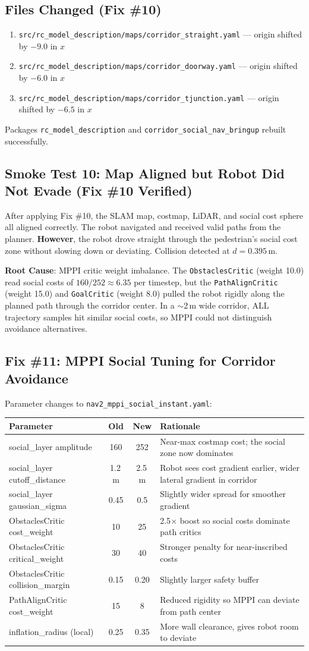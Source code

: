 \documentclass[11pt]{article}
\newcommand{\logentry}[1]{\subsection*{#1}}
\begin{document}
\logentry{Files Changed (Fix \#10)}
\begin{enumerate}
  \item \texttt{src/rc\_model\_description/maps/corridor\_straight.yaml} --- origin shifted by $-9.0$ in $x$
  \item \texttt{src/rc\_model\_description/maps/corridor\_doorway.yaml} --- origin shifted by $-6.0$ in $x$
  \item \texttt{src/rc\_model\_description/maps/corridor\_tjunction.yaml} --- origin shifted by $-6.5$ in $x$
\end{enumerate}
Packages \texttt{rc\_model\_description} and
\texttt{corridor\_social\_nav\_bringup} rebuilt successfully.

\logentry{Smoke Test 10: Map Aligned but Robot Did Not Evade (Fix \#10 Verified)}
After applying Fix \#10, the SLAM map, costmap, LiDAR, and social cost sphere all
aligned correctly. The robot navigated and received valid paths from the planner.
\textbf{However}, the robot drove straight through the pedestrian's social cost zone
without slowing down or deviating. Collision detected at $d = 0.395$\,m.

\textbf{Root Cause}: MPPI critic weight imbalance. The \texttt{ObstaclesCritic}
(weight 10.0) read social costs of $160/252 \approx 6.35$ per timestep, but the
\texttt{PathAlignCritic} (weight 15.0) and \texttt{GoalCritic} (weight 8.0) pulled
the robot rigidly along the planned path through the corridor center. In a $\sim$2\,m
wide corridor, ALL trajectory samples hit similar social costs, so MPPI could not
distinguish avoidance alternatives.

\logentry{Fix \#11: MPPI Social Tuning for Corridor Avoidance}
Parameter changes to \texttt{nav2\_mppi\_social\_instant.yaml}:
\begin{center}
\begin{tabular}{|l|c|c|p{5cm}|}
\hline
\textbf{Parameter} & \textbf{Old} & \textbf{New} & \textbf{Rationale} \\
\hline
social\_layer amplitude & 160 & 252 & Near-max costmap cost; the social zone now
dominates \\
\hline
social\_layer cutoff\_distance & 1.2\,m & 2.5\,m & Robot sees cost gradient earlier,
wider lateral gradient in corridor \\
\hline
social\_layer gaussian\_sigma & 0.45 & 0.5 & Slightly wider spread for smoother
gradient \\
\hline
ObstaclesCritic cost\_weight & 10 & 25 & 2.5$\times$ boost so social costs dominate
path critics \\
\hline
ObstaclesCritic critical\_weight & 30 & 40 & Stronger penalty for near-inscribed
costs \\
\hline
ObstaclesCritic collision\_margin & 0.15 & 0.20 & Slightly larger safety buffer \\
\hline
PathAlignCritic cost\_weight & 15 & 8 & Reduced rigidity so MPPI can deviate from
path center \\
\hline
inflation\_radius (local) & 0.25 & 0.35 & More wall clearance, gives robot room to
deviate \\
\hline
\end{tabular}
\end{center}
\end{document}
